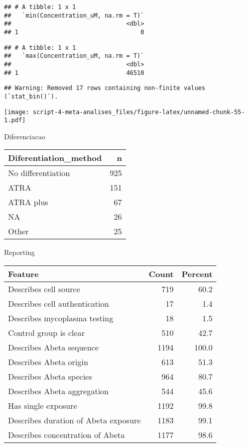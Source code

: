 \documentclass[
]{article}
\begin{document}
\begin{verbatim}
## # A tibble: 1 x 1
##   `min(Concentration_uM, na.rm = T)`
##                                <dbl>
## 1                                  0
\end{verbatim}

\begin{verbatim}
## # A tibble: 1 x 1
##   `max(Concentration_uM, na.rm = T)`
##                                <dbl>
## 1                              46510
\end{verbatim}

\begin{verbatim}
## Warning: Removed 17 rows containing non-finite values (`stat_bin()`).
\end{verbatim}

\texttt{[image: script-4-meta-analises\_files/figure-latex/unnamed-chunk-55-1.pdf]}

Diferenciacao

\begin{longtable}[]{@{}lr@{}}
\toprule()
Diferentiation\_method & n \\
\midrule()
\endhead
No differentiation & 925 \\
ATRA & 151 \\
ATRA plus & 67 \\
NA & 26 \\
Other & 25 \\
\bottomrule()
\end{longtable}

Reporting

\begin{longtable}[]{@{}lrr@{}}
\toprule()
Feature & Count & Percent \\
\midrule()
\endhead
Describes cell source & 719 & 60.2 \\
Describes cell authentication & 17 & 1.4 \\
Describes mycoplasma testing & 18 & 1.5 \\
Control group is clear & 510 & 42.7 \\
Describes Abeta sequence & 1194 & 100.0 \\
Describes Abeta origin & 613 & 51.3 \\
Describes Abeta species & 964 & 80.7 \\
Describes Abeta aggregation & 544 & 45.6 \\
Has single exposure & 1192 & 99.8 \\
Describes duration of Abeta exposure & 1183 & 99.1 \\
Describes concentration of Abeta & 1177 & 98.6 \\
\bottomrule()
\end{longtable}
\end{document}

